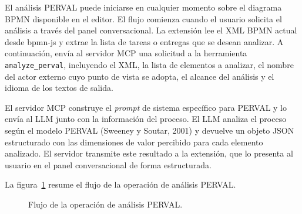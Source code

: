 El análisis PERVAL puede iniciarse en cualquier momento sobre el diagrama BPMN disponible en el editor. El flujo comienza cuando el usuario solicita el análisis a través del panel conversacional. La extensión lee el XML BPMN actual desde bpmn-js y extrae la lista de tareas o entregas que se desean analizar. A continuación, envía al servidor MCP una solicitud a la herramienta \texttt{analyze\_perval}, incluyendo el XML, la lista de elementos a analizar, el nombre del actor externo cuyo punto de vista se adopta, el alcance del análisis y el idioma de los textos de salida.

El servidor MCP construye el \textit{prompt} de sistema específico para PERVAL y lo envía al LLM junto con la información del proceso. El LLM analiza el proceso según el modelo PERVAL (Sweeney y Soutar, 2001) y devuelve un objeto JSON estructurado con las dimensiones de valor percibido para cada elemento analizado. El servidor transmite este resultado a la extensión, que lo presenta al usuario en el panel conversacional de forma estructurada.

La figura~\ref{fig:flujoPerval} resume el flujo de la operación de análisis PERVAL.

\shorthandoff{<>}
\begin{figure}[ht]
\centering
{}
\caption{Flujo de la operación de análisis PERVAL.}
\label{fig:flujoPerval}
\end{figure}
\shorthandon{<>}

